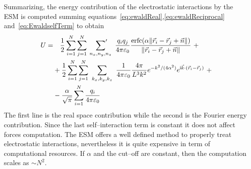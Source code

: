 Summarizing, the energy contribution of the electrostatic interactions by the \ac{ESM} is computed summing 
equations~\eqref{eq:ewaldReal},\eqref{eq:ewaldReciprocal} and~\eqref{eq:EwaldselfTerm} to obtain
\begin{equation}
	\begin{aligned}
		U =&\quad\frac{1}{2}\sum_{i=1}^N\sum_{j=1}^N\ \sideset{}{'}\sum_{n_x,n_y,n_z}\ \frac{q_iq_j}{4 \pi \varepsilon_0} \frac{\erfc{(\alpha \| \vec r_i - \vec r_j + \vec n \|)}}{\| \vec r_i - \vec r_j + \vec n \|}\ + \\
		 &+ \frac{1}{2}\sum_{i=1}^N\sum_{j=1}^N\ \sum_{k_x,k_y,k_z}\  \frac{1}{4\pi\varepsilon_0}\frac{4\pi}{L^3k^2}e^{-k^2/(4\alpha^2)}e^{\mathsf{i}{\vec k \cdot (\vec r_i - \vec r_j)}}\ + \\
		 &- \frac{\alpha}{\sqrt{\pi}}\sum_{i=1}^N\frac{q_i}{4\pi\varepsilon_0}
	\end{aligned}
	\label{eq:EwaldEnergy}
\end{equation}
The first line is the real space contribution while the second is the Fourier energy contribution. Since the last 
self--interaction term is constant it does not affect forces computation. The \ac{ESM} offers a well defined 
method to properly treat electrostatic interactions, nevertheless it is quite expensive in term of computational 
resources. If $\alpha$ and the cut--off are constant, then the computation scales as $\sim N^2$.

